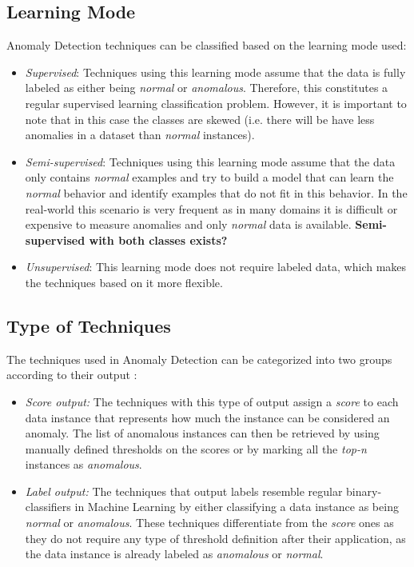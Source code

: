 \subsection{Learning Mode} \label{sec:anomly_learn}

Anomaly Detection techniques can be classified based on the learning mode used:

\begin{itemize}
	\item \textit{Supervised}: Techniques using this learning mode assume that the data is fully labeled as either being \textit{normal} or \textit{anomalous}.
	Therefore, this constitutes a regular supervised learning classification problem. However, it is important to note that in this case the classes are skewed (i.e. there will be have less anomalies in a dataset than \textit{normal} instances).
	
	\item \textit{Semi-supervised}: Techniques using this learning mode assume that the data only contains \textit{normal} examples and try to build a model that can learn the \textit{normal} behavior and identify examples that do not fit in this behavior.
	In the real-world this scenario is very frequent as in many domains it is difficult or expensive to measure anomalies and only \textit{normal} data is available. \textbf{Semi-supervised with both classes exists?}
	
	\item \textit{Unsupervised}: This learning mode does not require labeled data, which makes the techniques based on it more flexible.
\end{itemize}


\subsection{Type of Techniques} \label{sec:anomaly_appr}

The techniques used in Anomaly Detection can be categorized into two groups according to their output \cite{Kandhari2009}:

\begin{itemize}
	\item \textit{Score output:} The techniques with this type of output assign a \textit{score} to each data instance that represents how much the instance can be considered an anomaly. The list of anomalous instances can then be retrieved by using manually defined thresholds on the scores or by marking all the \textit{top-n} instances as \textit{anomalous}.
	
	\item \textit{Label output:} The techniques that output labels resemble regular binary-classifiers in Machine Learning by either classifying a data instance as being \textit{normal} or \textit{anomalous}. These techniques differentiate from the \textit{score} ones as they do not require any type of threshold definition after their application, as the data instance is already labeled as \textit{anomalous} or \textit{normal}.
\end{itemize}

